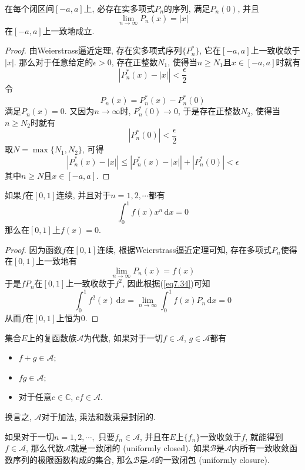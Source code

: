 \documentclass[cn,12pt,math=mtpro2,citestyle=gb7714-2015,bibstyle=gb7714-2015,twocol]{elegantbook}
\newcommand{\dx}{\,\text{d}x}
\newcommand{\limn }{\lim_{n\to\infty}}
\begin{document}
\begin{corollary}\label{cor:cor7.1}
在每个闭区间$[-a,a]$上, 必存在实多项式$P_n$的序列, 满足$P_n(0)$, 并且
$$\limn P_n(x)=|x|$$
在$[-a,a]$上一致地成立.
\end{corollary}
\begin{proof}
  由Weierstrass逼近定理, 存在实多项式序列$\{P_n^\ast\}$, 它在$[-a,a]$上一致收敛于$|x|$. 那么对于任意给定的$\epsilon>0$, 存在正整数$N_1$, 使得当$n\geq N_1$且$x\in[-a,a]$时就有
  $$\left|P_n^\ast(x)-|x|\right|<\frac{\epsilon}{2}$$
  令
  $$P_n(x)=P_n^\ast(x)-P_n^\ast(0)$$
  满足$P_n(x)=0$. 又因为$n\to\infty$时, $P_n^\ast(0)\to 0$, 于是存在正整数$N_2$, 使得当$n\geq N_2$时就有
  $$|P_n^\ast(0)|<\frac{\epsilon}{2}$$
  取$N=\max\{N_1,N_2\}$, 可得
  $$\left|P_n^\ast(x)-|x|\right|\leq\left|P_n^\ast(x)-|x|\right|+|P_n^\ast(0)|<\epsilon$$
  其中$n\geq N$且$x\in[-a,a]$.

\end{proof}
\begin{example}
如果$f$在$[0,1]$连续, 并且对于$n=1,2,\cdots$都有
\begin{equation}\label{eq7.34}
  \int_{0}^{1}f(x)x^n\dx=0
\end{equation}
那么在$[0,1]$上$f(x)=0$.
\end{example}
\begin{proof}
  因为函数$f$在$[0,1]$连续, 根据Weierstrass逼近定理可知, 存在多项式$P_n$使得在$[0,1]$上一致地有
  $$\lim_{n\to\infty}P_n(x)=f(x)$$
  于是$fP_n$在$[0,1]$上一致收敛于$f^2$, 因此根据(\ref{eq7.34})可知
  $$\int_{0}^{1}f^2(x)\dx=\limn \int_{0}^{1}f(x)P_n\dx=0$$
  从而$f$在$[0,1]$上恒为$0$.
\end{proof}
\begin{definition}
  集合$E$上的复函数族$\mathscr{A}$为代数, 如果对于一切$f\in\mathscr{A}$, $g\in\mathscr{A}$都有
  \begin{itemize}
   \item $f+g\in\mathscr{A}$;
   \item $fg\in\mathscr{A}$;
   \item 对于任意$c\in\mathbb{C}$, $cf\in\mathscr{A}$.
   \end{itemize}
   换言之, $\mathscr{A}$对于加法, 乘法和数乘是封闭的.
\end{definition}
\begin{definition}
如果对于一切$n=1,2,\cdots,$ 只要$f_n\in\mathscr{A}$, 并且在$E$上$\{f_n\}$一致收敛于$f$, 就能得到$f\in\mathscr{A}$, 那么代数$\mathscr{A}$就是一致闭的 (uniformly closed). 如果$\mathscr{B}$是$\mathscr{A}$内所有一致收敛函数序列的极限函数构成的集合, 那么$\mathscr{B}$是$\mathscr{A}$的一致闭包 (uniformly closure).
\end{definition}
\end{document}
